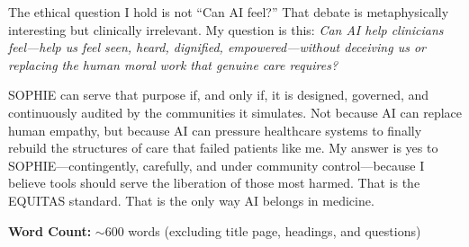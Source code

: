\documentclass[12pt,twoside]{article}
\begin{document}
The ethical question I hold is not \enquote{Can AI feel?} That debate is metaphysically interesting but clinically irrelevant. My question is this: \emph{Can AI help clinicians feel—help us feel seen, heard, dignified, empowered—without deceiving us or replacing the human moral work that genuine care requires?}

SOPHIE can serve that purpose if, and only if, it is designed, governed, and continuously audited by the communities it simulates. Not because AI can replace human empathy, but because AI can pressure healthcare systems to finally rebuild the structures of care that failed patients like me. My answer is yes to SOPHIE—contingently, carefully, and under community control—because I believe tools should serve the liberation of those most harmed. That is the EQUITAS standard. That is the only way AI belongs in medicine.

\vfill
\noindent\centering\footnotesize\textbf{Word Count:} $\sim$600 words (excluding title page, headings, and questions)
\end{document}
